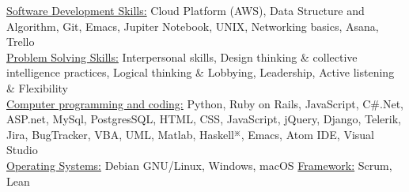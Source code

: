 \documentclass[a4paper, 10pt]{article}
\begin{document}
\begin{center}
\begin{flushleft} 

	\uline{\fontsize{10pt}{10}\selectfont Software Development Skills:} {Cloud Platform (AWS),  Data Structure and Algorithm, Git, Emacs, Jupiter Notebook, UNIX, Networking basics, Asana, Trello}\\
		\uline{\fontsize{10pt}{10}\selectfont Problem Solving Skills:} {Interpersonal skills, Design thinking \& collective intelligence practices, Logical thinking \& Lobbying, Leadership, Active listening \& Flexibility}\\
		\uline {\fontsize{10pt}{10}\selectfont Computer programming and coding:} {Python, Ruby on Rails, JavaScript, C\#\/.Net, ASP.net, MySql, PostgresSQL, HTML, CSS, JavaScript, jQuery, Django, Telerik, Jira, BugTracker, VBA, UML, Matlab, Haskell$^{\divideontimes} $, Emacs, Atom IDE, Visual Studio}\\
		\uline {\fontsize{10pt}{10}\selectfont Operating Systems:} {Debian GNU/Linux, Windows, macOS} \hspace{2cm} \uline {\fontsize{10pt}{10}\selectfont Framework:} {Scrum, Lean} \\
\end{flushleft}

\vspace{-6ex}

\end{center}
\end{document}
